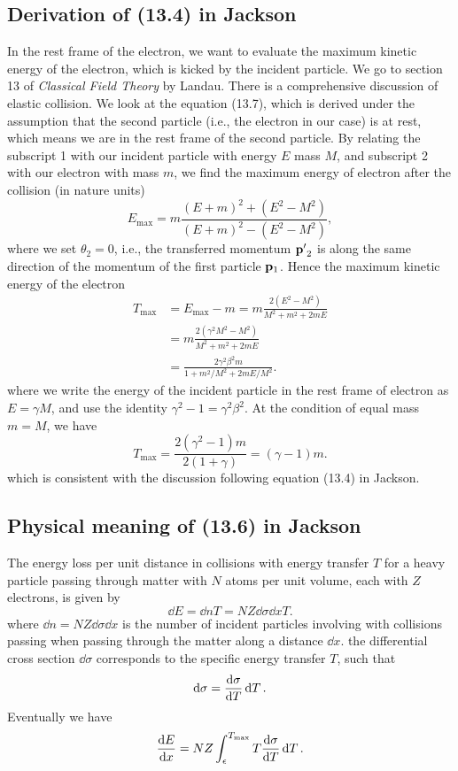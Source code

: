 \documentclass[10pt]{article}
\begin{document}
\subsection{Derivation of (13.4) in Jackson}
In the rest frame of the electron, we want to evaluate the maximum kinetic energy of the electron, which is kicked by the incident particle. We go to section 13 of \textit{Classical Field Theory} by Landau. There is a comprehensive discussion of elastic collision. We look at the equation (13.7), which is derived under the assumption that the second particle (i.e., the electron in our case) is at rest, which means we are in the rest frame of the second particle. By relating the subscript 1 with our incident particle with energy $E$ mass $M$, and subscript 2 with our electron with mass $m$, we find the maximum energy of electron after the collision (in nature units)
\begin{equation}
	E_{\max} = m \frac{(E + m)^2 + (E^2 - M^2)}{(E + m)^2 - (E^2 - M^2)},
\end{equation}
where we set $\theta_2 = 0$, i.e., the transferred momentum $\vb{p'}_2$ is along the same direction of the momentum of the first particle $\vb{p}_1$. Hence the maximum kinetic energy of the electron
\begin{align*}
	T_{\max} &= E_{\max} - m = m \frac{2(E^2 - M^2)}{M^2 + m^2 + 2mE} \\
	&= m \frac{2(\gamma^2 M^2 - M^2)}{M^2 + m^2 + 2mE} \\
	&= \frac{2\gamma^2 \beta^2 m }{1+m^2/M^2 + 2mE/M^2}.
\end{align*}
where we write the energy of the incident particle in the rest frame of electron as $E = \gamma M$, and use the identity $\gamma^2 - 1 = \gamma^2 \beta^2$.
At the condition of equal mass $m = M$, we have
\begin{equation}
	T_{\max} = \frac{2(\gamma^2 - 1)m}{2(1+\gamma )} = (\gamma - 1) m.
\end{equation}
which is consistent with the discussion following equation (13.4) in Jackson.

\subsection{Physical meaning of (13.6) in Jackson}
The energy loss per unit distance in collisions with energy transfer $T$ for a heavy particle passing through matter with $N$ atoms per unit volume, each with $Z$ electrons, is given by
\begin{equation}
	\dd{E} = \dd{n} T = NZ \dd{\sigma} \dd{x} T.
\end{equation}
where $\dd{n} = NZ \dd{\sigma} \dd{x}$ is the number of incident particles involving with collisions passing when passing through the matter along a distance $\dd{x}$. the differential cross section $\dd{\sigma}$ corresponds to the specific energy transfer $T$, such that
\begin{equation}
	\dd{\sigma} = \dv{\sigma}{T} \dd{T}.
\end{equation}
Eventually we have
\begin{equation}
	\dv{E}{x} = NZ \int_{\epsilon}^{T_{\max}} T \dv{\sigma}{T} \dd{T}.
\end{equation}
\end{document}
